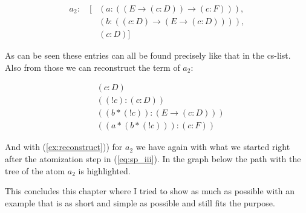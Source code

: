 \begin{equation}
\begin{split}
	a_2: \quad [&(a: ((E \rightarrow (c:D)) \rightarrow (c:F))), \\
	&(b: ((c:D) \rightarrow (E \rightarrow (c:D)))), \\
	&(c: D)]
\end{split}
\end{equation}

As can be seen these entries can all be found precisely like that in the cs-list. Also from those we can reconstruct the term of $a_2$: 

\begin{align}
	& (c:D) \\
	& ((!c):(c:D)) \\
	& ((b*(!c)):(E \rightarrow (c:D)))\\
	& ((a*(b*(!c))):(c:F)) \label{ex:reconstruct}
\end{align}

And with (\ref{ex:reconstruct})) for $a_2$ we have again with what we started right after the atomization step in (\ref{eq:sp_iii}). In the graph below the path with the tree of the atom $a_2$ is highlighted.



\bigskip
This concludes this chapter where I tried to show as much as possible with an example that is as short and simple as possible and still fits the purpose. 
